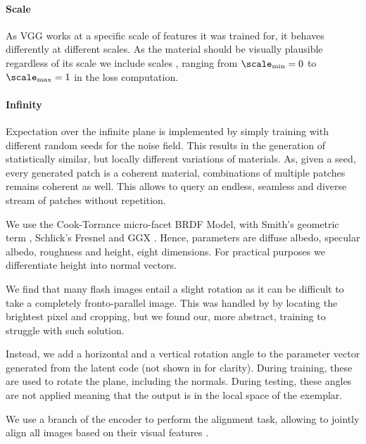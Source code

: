 \documentclass[acmtog, review, anonymous]{acmart}
\begin{document}
\paragraph{Scale}
As VGG works at a specific scale of features it was trained for, it behaves differently at different scales. As the material should be visually plausible regardless of its scale we include  scales \scale, ranging from $\scale_\mathrm{min}=0$ to $\scale_\mathrm{max}=1$ in the loss computation.

\paragraph{Infinity}
Expectation over the infinite plane is implemented by simply training with different random seeds for the noise field. This results in the generation of statistically similar, but locally different variations of materials.
As, given a seed, every generated patch is a coherent material, combinations of multiple patches remains coherent as well.
This allows to query an endless, seamless and diverse stream of patches without repetition.

We use the Cook-Torrance  micro-facet BRDF Model, with Smith's geometric term \cite{heitz2014understanding}, Schlick's  Fresnel and GGX \cite{walter2007microfacet}.
Hence, parameters are diffuse albedo, specular albedo, roughness and height, \ie eight dimensions. For practical purposes we differentiate height into normal vectors.

We find that many flash images entail a slight rotation as it can be difficult to take a completely fronto-parallel image.
This was handled by \citet{aittala2016reflectance} by locating the brightest pixel and cropping, but we found our, more abstract, training to struggle with such solution.

Instead, we add a horizontal and a vertical rotation angle to the parameter vector generated from the latent code (not shown in  for clarity).
During training, these are used to rotate the plane, including the normals.
During testing, these angles are not applied meaning that the output is in the local space of the exemplar.

We use a branch of the encoder to perform the alignment task, allowing to jointly align all images based on their visual features .
\end{document}
